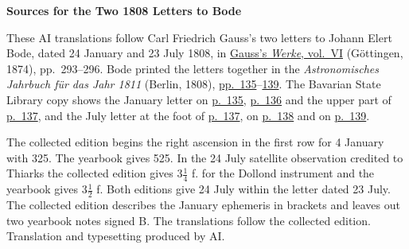 \clearpage\thispagestyle{empty}
\begin{center}\textbf{Sources for the Two 1808 Letters to Bode}\end{center}
\noindent These AI translations follow Carl Friedrich Gauss’s two letters to Johann Elert Bode, dated 24 January and 23 July 1808, in \href{https://gdz.sub.uni-goettingen.de/id/PPN236007467}{Gauss’s \textit{Werke}, vol.~VI} (Göttingen, 1874), pp.~293--296. Bode printed the letters together in the \textit{Astronomisches Jahrbuch für das Jahr 1811} (Berlin, 1808), \href{https://www.digitale-sammlungen.de/en/view/bsb10538340?page=147}{pp.~135}--\href{https://www.digitale-sammlungen.de/en/view/bsb10538340?page=151}{139}. The Bavarian State Library copy shows the January letter on \href{https://www.digitale-sammlungen.de/en/view/bsb10538340?page=147}{p.~135}, \href{https://www.digitale-sammlungen.de/en/view/bsb10538340?page=148}{p.~136} and the upper part of \href{https://www.digitale-sammlungen.de/en/view/bsb10538340?page=149}{p.~137}, and the July letter at the foot of \href{https://www.digitale-sammlungen.de/en/view/bsb10538340?page=149}{p.~137}, on \href{https://www.digitale-sammlungen.de/en/view/bsb10538340?page=150}{p.~138} and on \href{https://www.digitale-sammlungen.de/en/view/bsb10538340?page=151}{p.~139}.
\par\medskip
The collected edition begins the right ascension in the first row for 4 January with 325. The yearbook gives 525. In the 24 July satellite observation credited to Thiarks the collected edition gives $3\tfrac14$ f. for the Dollond instrument and the yearbook gives $3\tfrac12$ f. Both editions give 24 July within the letter dated 23 July. The collected edition describes the January ephemeris in brackets and leaves out two yearbook notes signed B. The translations follow the collected edition. Translation and typesetting produced by AI.
\clearpage

